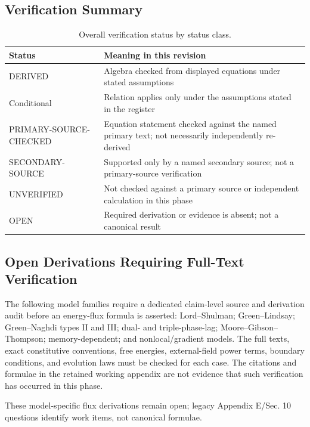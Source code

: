\subsection{Verification Summary}

\begin{table}[htbp]
\centering
\small
\setlength{\tabcolsep}{3pt}
\caption{Overall verification status by status class.}
\label{tab:appA-summary}
\begin{tabularx}{\textwidth}{@{}lY@{}}
\toprule
\textbf{Status} & \textbf{Meaning in this revision} \\
\midrule
DERIVED & Algebra checked from displayed equations under stated assumptions \\
Conditional & Relation applies only under the assumptions stated in the register \\
PRIMARY-SOURCE-CHECKED & Equation statement checked against the named primary text; not necessarily independently re-derived \\
SECONDARY-SOURCE & Supported only by a named secondary source; not a primary-source verification \\
UNVERIFIED & Not checked against a primary source or independent calculation in this phase \\
OPEN & Required derivation or evidence is absent; not a canonical result \\
\bottomrule
\end{tabularx}
\end{table}

\subsection{Open Derivations Requiring Full-Text Verification}

The following model families require a dedicated claim-level source and derivation audit before an energy-flux formula is asserted: Lord--Shulman; Green--Lindsay; Green--Naghdi types II and III; dual- and triple-phase-lag; Moore--Gibson--Thompson; memory-dependent; and nonlocal/gradient models. The full texts, exact constitutive conventions, free energies, external-field power terms, boundary conditions, and evolution laws must be checked for each case. The citations and formulae in the retained working appendix are not evidence that such verification has occurred in this phase.

These model-specific flux derivations remain open; legacy Appendix E/Sec. 10 questions identify work items, not canonical formulae.

